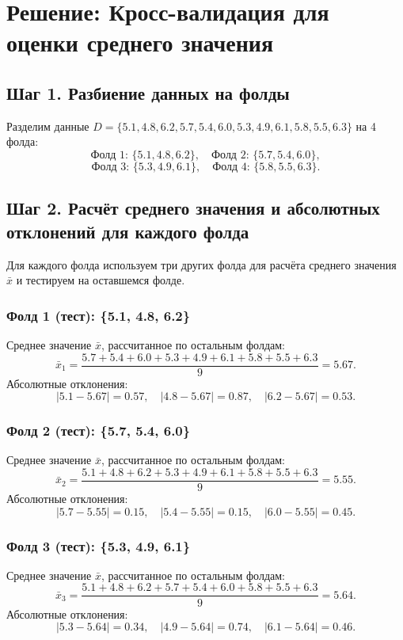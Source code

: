 \section*{Решение: Кросс-валидация для оценки среднего значения}

\subsection*{Шаг 1. Разбиение данных на фолды}
Разделим данные \(D = \{5.1, 4.8, 6.2, 5.7, 5.4, 6.0, 5.3, 4.9, 6.1, 5.8, 5.5, 6.3\}\) на 4 фолда:
\[
\text{Фолд 1: } \{5.1, 4.8, 6.2\}, \quad
\text{Фолд 2: } \{5.7, 5.4, 6.0\},
\]
\[
\text{Фолд 3: } \{5.3, 4.9, 6.1\}, \quad
\text{Фолд 4: } \{5.8, 5.5, 6.3\}.
\]

\subsection*{Шаг 2. Расчёт среднего значения и абсолютных отклонений для каждого фолда}
Для каждого фолда используем три других фолда для расчёта среднего значения \(\bar{x}\) и тестируем на оставшемся фолде.

\subsubsection*{Фолд 1 (тест): \{5.1, 4.8, 6.2\}}
Среднее значение \(\bar{x}\), рассчитанное по остальным фолдам:
\[
\bar{x}_1 = \frac{5.7 + 5.4 + 6.0 + 5.3 + 4.9 + 6.1 + 5.8 + 5.5 + 6.3}{9} = 5.67.
\]
Абсолютные отклонения:
\[
|5.1 - 5.67| = 0.57, \quad |4.8 - 5.67| = 0.87, \quad |6.2 - 5.67| = 0.53.
\]

\subsubsection*{Фолд 2 (тест): \{5.7, 5.4, 6.0\}}
Среднее значение \(\bar{x}\), рассчитанное по остальным фолдам:
\[
\bar{x}_2 = \frac{5.1 + 4.8 + 6.2 + 5.3 + 4.9 + 6.1 + 5.8 + 5.5 + 6.3}{9} = 5.55.
\]
Абсолютные отклонения:
\[
|5.7 - 5.55| = 0.15, \quad |5.4 - 5.55| = 0.15, \quad |6.0 - 5.55| = 0.45.
\]

\subsubsection*{Фолд 3 (тест): \{5.3, 4.9, 6.1\}}
Среднее значение \(\bar{x}\), рассчитанное по остальным фолдам:
\[
\bar{x}_3 = \frac{5.1 + 4.8 + 6.2 + 5.7 + 5.4 + 6.0 + 5.8 + 5.5 + 6.3}{9} = 5.64.
\]
Абсолютные отклонения:
\[
|5.3 - 5.64| = 0.34, \quad |4.9 - 5.64| = 0.74, \quad |6.1 - 5.64| = 0.46.
\]

